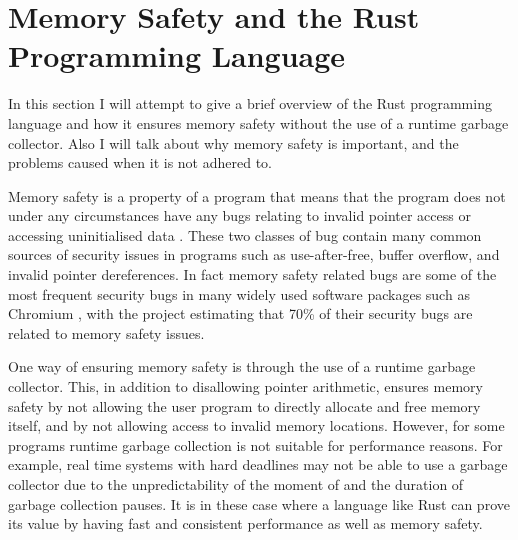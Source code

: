 
\section{Memory Safety and the Rust Programming Language}

In this section I will attempt to give a brief overview of the Rust programming
language and how it ensures memory safety without the use of a runtime garbage
collector. Also I will talk about why memory safety is important, and the
problems caused when it is not adhered to.

Memory safety is a property of a program that means that the program does not
under any circumstances have any bugs relating to invalid pointer access or
accessing uninitialised data . These two classes of bug contain
many common sources of security issues in programs such as use-after-free,
buffer overflow, and invalid pointer dereferences. In fact memory safety
related bugs are some of the most frequent security bugs in many widely used
software packages such as Chromium \cite{chromium-mem-safety}, with the project
estimating that 70\% of their security bugs are related to memory safety
issues.


One way of ensuring memory safety is through the use of a runtime garbage
collector. This, in addition to disallowing pointer arithmetic, ensures memory
safety by not allowing the user program to directly allocate and free memory
itself, and by not allowing access to invalid memory locations. However, for
some programs runtime garbage collection is not suitable for performance
reasons. For example, real time systems with hard deadlines may not be able to
use a garbage collector due to the unpredictability of the moment of and the
duration of garbage collection pauses. It is in these case where a language
like Rust can prove its value by having fast and consistent performance as well
as memory safety.

